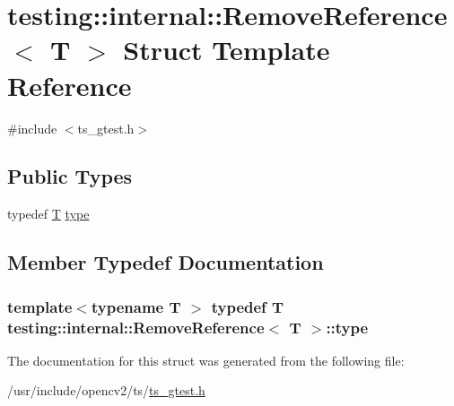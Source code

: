 \hypertarget{structtesting_1_1internal_1_1RemoveReference}{\section{testing\-:\-:internal\-:\-:Remove\-Reference$<$ T $>$ Struct Template Reference}
\label{structtesting_1_1internal_1_1RemoveReference}
}


{\ttfamily \#include $<$ts\-\_\-gtest.\-h$>$}

\subsection*{Public Types}
\begin{DoxyCompactItemize}
\item 
typedef \hyperlink{calib3d_8hpp_a3efb9551a871ddd0463079a808916717}{T} \hyperlink{structtesting_1_1internal_1_1RemoveReference_a9ca4f6499579225f7986b789ee4b2895}{type}
\end{DoxyCompactItemize}


\subsection{Member Typedef Documentation}
\hypertarget{structtesting_1_1internal_1_1RemoveReference_a9ca4f6499579225f7986b789ee4b2895}{
\subsubsection[{type}]{\setlength{\rightskip}{0pt plus 5cm}template$<$typename T $>$ typedef {\bf T} {\bf testing\-::internal\-::\-Remove\-Reference}$<$ {\bf T} $>$\-::{\bf type}}}\label{structtesting_1_1internal_1_1RemoveReference_a9ca4f6499579225f7986b789ee4b2895}


The documentation for this struct was generated from the following file\-:\begin{DoxyCompactItemize}
\item 
/usr/include/opencv2/ts/\hyperlink{ts__gtest_8h}{ts\-\_\-gtest.\-h}\end{DoxyCompactItemize}
